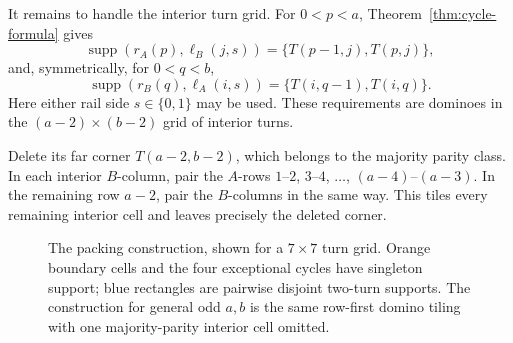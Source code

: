 It remains to handle the interior turn grid.  For \(0<p<a\),
Theorem~\ref{thm:cycle-formula} gives
\begin{equation}
\label{eq:domino-support-a}
 \operatorname{supp}(r_A(p),\ell_B(j,s))
   =\{T(p-1,j),T(p,j)\},
\end{equation}
and, symmetrically, for \(0<q<b\),
\begin{equation}
\label{eq:domino-support-b}
 \operatorname{supp}(r_B(q),\ell_A(i,s))
   =\{T(i,q-1),T(i,q)\}.
\end{equation}
Here either rail side \(s\in\{0,1\}\) may be used.  These requirements are
dominoes in the \((a-2)\times(b-2)\) grid of interior turns.

Delete its far corner \(T(a-2,b-2)\), which belongs to the majority parity
class.  In each interior \(B\)-column, pair the \(A\)-rows
\(1\)--\(2\), \(3\)--\(4\), \(\ldots\), \((a-4)\)--\((a-3)\).
In the remaining row \(a-2\), pair the \(B\)-columns in the same way.  This
tiles every remaining interior cell and leaves precisely the deleted corner.

\begin{figure}[htbp]
\centering
{}
\caption{The packing construction, shown for a \(7\times7\) turn grid.
Orange boundary cells and the four exceptional cycles have singleton support;
blue rectangles are pairwise disjoint two-turn supports.  The construction for
general odd \(a,b\) is the same row-first domino tiling with one majority-parity
interior cell omitted.}
\label{fig:packing-grid}
\end{figure}

